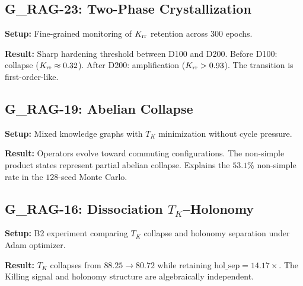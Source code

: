 \subsection{G\_RAG-23: Two-Phase Crystallization}\label{app:g_rag_23}

\textbf{Setup:} Fine-grained monitoring of $K_{\mathrm{rr}}$ retention across $300$ epochs.

\textbf{Result:} Sharp hardening threshold between D100 and D200. Before D100: collapse ($K_{\mathrm{rr}} \approx 0.32$). After D200: amplification ($K_{\mathrm{rr}} > 0.93$). The transition is first-order-like.

\subsection{G\_RAG-19: Abelian Collapse}\label{app:g_rag_19}

\textbf{Setup:} Mixed knowledge graphs with $T_K$ minimization without cycle pressure.

\textbf{Result:} Operators evolve toward commuting configurations. The non-simple product states represent partial abelian collapse. Explains the $53.1\%$ non-simple rate in the $128$-seed Monte Carlo.

\subsection{G\_RAG-16: Dissociation $T_K$--Holonomy}\label{app:g_rag_16}

\textbf{Setup:} B2 experiment comparing $T_K$ collapse and holonomy separation under Adam optimizer.

\textbf{Result:} $T_K$ collapses from $88.25 \to 80.72$ while retaining $\mathrm{hol\_sep} = 14.17\times$. The Killing signal and holonomy structure are algebraically independent.
